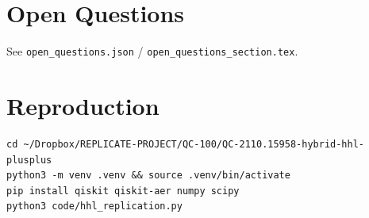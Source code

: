 \documentclass[11pt]{article}
\begin{document}
\section{Open Questions}
See \texttt{open\_questions.json} / \texttt{open\_questions\_section.tex}.

\section{Reproduction}
\begin{lstlisting}[basicstyle=\ttfamily\small,frame=single]
cd ~/Dropbox/REPLICATE-PROJECT/QC-100/QC-2110.15958-hybrid-hhl-plusplus
python3 -m venv .venv && source .venv/bin/activate
pip install qiskit qiskit-aer numpy scipy
python3 code/hhl_replication.py
\end{lstlisting}
\end{document}
